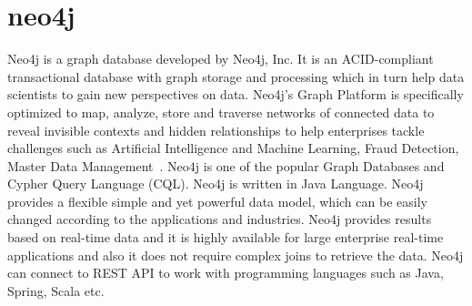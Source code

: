 \section{neo4j}

Neo4j is a graph database developed by Neo4j, Inc. It is an
ACID-compliant transactional database with graph storage and
processing which in turn help data scientists to gain new perspectives
on data. Neo4j's Graph Platform is specifically optimized to map,
analyze, store and traverse networks of connected data to reveal
invisible contexts and hidden relationships to help enterprises tackle
challenges such as Artificial Intelligence and Machine Learning, Fraud
Detection, Master Data Management~\cite{hid-sp18-513-neo4j}. Neo4j is one 
of the popular Graph Databases and Cypher Query Language (CQL). 
Neo4j is written in Java Language. Neo4j provides a flexible simple and yet 
powerful data model, which can be easily changed according to the applications 
and industries. Neo4j provides results based on real-time data and it is highly
available for large enterprise real-time applications and also it does not 
require complex joins to retrieve the data. Neo4j can connect to REST API to 
work with programming languages such as Java, Spring, Scala etc.
